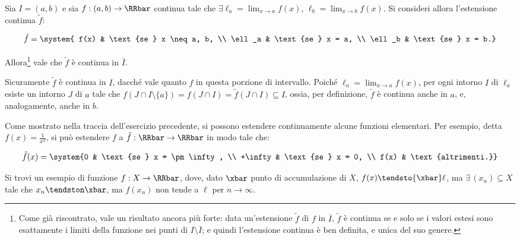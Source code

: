 \documentclass[11pt]{article}
\begin{document}
	\begin{exercise}
		Sia $I = (a, b)$ e sia $f : (a, b) \to \RRbar$ continua tale che
		$\exists \ell_a = \lim_{x \to a} f(x)$, $\ell_b = \lim_{x \to b} f(x)$.
		Si consideri allora l'estensione continua $\tilde f$:
		
		\[ \tilde f = \system{ f(x) & \text{se } x \neq a, b, \\ \ell_a & \text{se } x = a, \\ \ell_b & \text{se } x = b.} \]
		
		Allora\footnote{Come
			già riscontrato, vale un risultato ancora più forte:
			data un'estensione $\tilde f$ di $f$ in $\overline I$, $\tilde f$
			è continua se e solo se i valori estesi sono esattamente i limiti
			della funzione nei punti di $I \setminus \overline I$; e quindi
			l'estensione continua è ben definita, e unica del suo genere.} vale che $\tilde f$ è continua in $\overline I$.
	\end{exercise}

	\begin{solution}
		Sicuramente $\tilde f$ è continua in $I$, dacché vale quanto
		$f$ in questa porzione di intervallo. Poiché $\ell_a = \lim_{x \to a} f(x)$, per ogni intorno $I$ di $\ell_a$ esiste un intorno $J$ di $a$
		tale che $f(J \cap I \setminus \{a\}) = f(J \cap I) = \tilde f(J \cap I) \subseteq I$, ossia, per definizione, $\tilde f$ è continua
		anche in $a$, e, analogamente, anche in $b$.
	\end{solution}

	\begin{remark} Come mostrato nella traccia dell'esercizio precedente,
		si possono estendere continuamente alcune funzioni elementari.
		Per esempio, detta $f(x) = \frac{1}{x^2}$, si può estendere $f$
		a $\tilde f : \RRbar \to \RRbar$ in modo tale che:
		
		\[ \tilde f(x) = \system {0 & \text{se } x = \pm \infty, \\ +\infty & \text{se } x = 0, \\ f(x) & \text{altrimenti.}} \]
	\end{remark}

	
	\begin{exercise}
		Si trovi un esempio di funzione $f : X \to \RRbar$, dove, dato $\xbar$ punto
		di accumulazione di $X$, $f(x) \tendsto{\xbar} \ell$, ma
		$\exists \, (x_n) \subseteq X$ tale che $x_n \tendston \xbar$, ma
		$f(x_n)$ non tende a $\ell$ per $n \to \infty$.
	\end{exercise}
\end{document}
